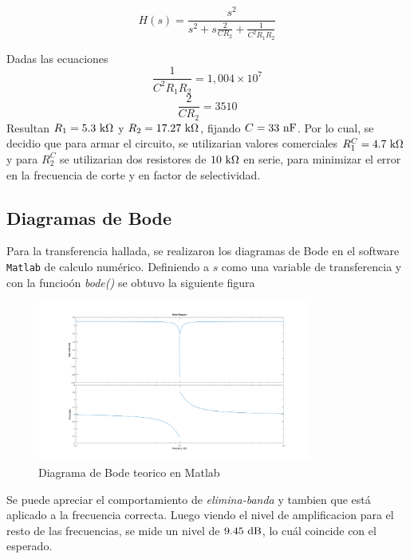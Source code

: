 
\begin{equation}
  H(s) = \frac{s^2}{s^2 +s \frac{2}{C R_2}+\frac{1}{C^2 R_1 R_2}}
\end{equation}

Dadas las ecuaciones
\begin{equation}
	\frac{1}{C^2 R_1 R_2}=1,004\times10^7
\end{equation}
\begin{equation}
	\frac{2}{C R_2}=3510
\end{equation}
Resultan $R_1=5.3 \ \si{\kilo\ohm}$ y $R_2=17.27\ \si{\kilo\ohm}$,  fijando $C=33\ \si{\nano\farad}$.
Por lo cual, se decidio que para armar el circuito, se utilizarian valores comerciales $R^C_1=4.7\ \si{\kilo\ohm}$ y para $R^C_2$ se utilizarian dos resistores de $10\ \si{\kilo\ohm}$ en serie, para minimizar el error en la frecuencia de corte y en factor de selectividad.

\subsection*{Diagramas de Bode}
Para la transferencia hallada, se realizaron los diagramas de Bode en el software \texttt{Matlab} de calculo num\'erico. Definiendo a $s$  como una variable de transferencia y con la funcio\'on \textit{bode()} se obtuvo la siguiente figura\\
\begin{figure}[h]
	\centering
	\includegraphics[width=9cm]{imagenes/BodeTeorico}	\caption{Diagrama de Bode teorico en Matlab}
\end{figure}

Se puede apreciar el comportamiento de \textit{elimina-banda} y tambien que est\'a aplicado a la frecuencia correcta. Luego viendo el nivel de amplificacion para el resto de las frecuencias, se mide un nivel de $9.45 \dB$, lo cu\'al coincide con el esperado.
